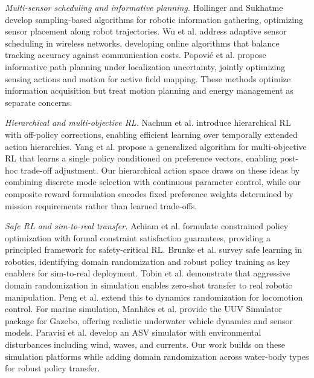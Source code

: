 \documentclass[conference]{IEEEtran}
\begin{document}
\textit{Multi-sensor scheduling and informative planning.} Hollinger and Sukhatme \cite{Hollinger2014ActiveSensing} develop sampling-based algorithms for robotic information gathering, optimizing sensor placement along robot trajectories. Wu et al. \cite{Wu2020SensorScheduling} address adaptive sensor scheduling in wireless networks, developing online algorithms that balance tracking accuracy against communication costs. Popovi\'{c} et al. \cite{Popovic2020InformativePlanning} propose informative path planning under localization uncertainty, jointly optimizing sensing actions and motion for active field mapping. These methods optimize information acquisition but treat motion planning and energy management as separate concerns.

\textit{Hierarchical and multi-objective RL.} Nachum et al. \cite{Nachum2018HIRO} introduce hierarchical RL with off-policy corrections, enabling efficient learning over temporally extended action hierarchies. Yang et al. \cite{Yang2019MORL} propose a generalized algorithm for multi-objective RL that learns a single policy conditioned on preference vectors, enabling post-hoc trade-off adjustment. Our hierarchical action space draws on these ideas by combining discrete mode selection with continuous parameter control, while our composite reward formulation encodes fixed preference weights determined by mission requirements rather than learned trade-offs.

\textit{Safe RL and sim-to-real transfer.} Achiam et al. \cite{Achiam2017CPO} formulate constrained policy optimization with formal constraint satisfaction guarantees, providing a principled framework for safety-critical RL. Brunke et al. \cite{Brunke2022SafeRL} survey safe learning in robotics, identifying domain randomization and robust policy training as key enablers for sim-to-real deployment. Tobin et al. \cite{Tobin2017DomainRandomization} demonstrate that aggressive domain randomization in simulation enables zero-shot transfer to real robotic manipulation. Peng et al. \cite{Peng2018SimToReal} extend this to dynamics randomization for locomotion control. For marine simulation, Manh\~{a}es et al. \cite{Manhaes2016UUVSimulator} provide the UUV Simulator package for Gazebo, offering realistic underwater vehicle dynamics and sensor models. Paravisi et al. \cite{Paravisi2019VRXSim} develop an ASV simulator with environmental disturbances including wind, waves, and currents. Our work builds on these simulation platforms while adding domain randomization across water-body types for robust policy transfer.
\end{document}
